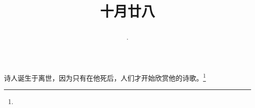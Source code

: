\title{\date[d=28,m=11,y=2024][year:cn-y,年,month:cn,day:cn,日,·,weekday]·十月廿八 }
诗人诞生于离世，因为只有在他死后，人们才开始欣赏他的诗歌。\footnote{ }

